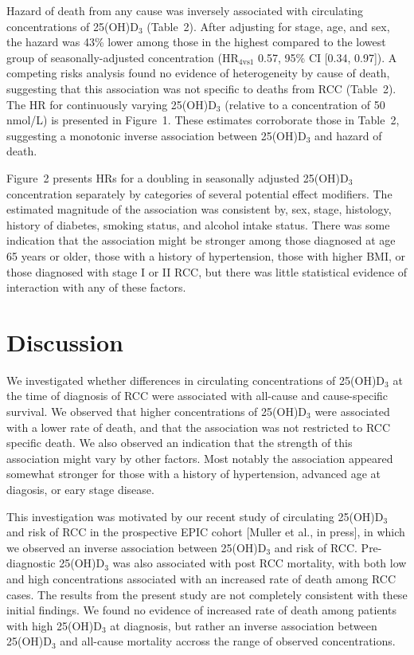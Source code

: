 \documentclass[a4paper,11pt]{article}
\begin{document}
Hazard of death from any cause was inversely associated with 
circulating concentrations of 25(OH)D$_3$ (Table~2). After adjusting for 
stage, age, and sex, the hazard was 43\% lower among those in the highest 
compared to the lowest group of seasonally-adjusted concentration 
(HR$_{4\text{vs}1}$ 0.57, 95\% CI [0.34, 0.97]). A competing risks analysis 
found no evidence of heterogeneity by cause of death, suggesting that this 
association was not specific to deaths from RCC (Table~2). The HR for 
continuously varying 25(OH)D$_3$ (relative to a concentration of 50 nmol/L) is 
presented in Figure~1. These estimates corroborate those in Table~2, suggesting 
a monotonic inverse association between 25(OH)D$_3$ and hazard of death.

Figure~2 presents HRs for a doubling in seasonally adjusted 25(OH)D$_3$ 
concentration separately by categories of several potential effect modifiers. 
The estimated magnitude of the association was consistent by, sex, stage, 
histology, history of diabetes, smoking status, and alcohol intake status. 
There was some indication that the association might be stronger among those 
diagnosed at age 65 years or older, those with a history of hypertension, those 
with higher BMI, or those diagnosed with stage I or II RCC, but there was 
little statistical evidence of interaction with any of these factors. 

\section*{Discussion}
We investigated whether differences in circulating concentrations of 
25(OH)D$_3$ at the time of diagnosis of RCC were associated with all-cause and 
cause-specific survival. We observed that higher concentrations of 25(OH)D$_3$ 
were associated with a lower rate of death, and that the 
association was not restricted to RCC specific death. We also observed an 
indication that the strength of this association might vary by other factors.
Most notably the association appeared somewhat stronger for those with a 
history of hypertension, advanced age at diagosis, or eary stage disease.

This investigation was motivated by our recent study of circulating 25(OH)D$_3$ 
and risk of RCC in the prospective EPIC cohort [Muller et al., in press], in 
which we observed an inverse association between 25(OH)D$_3$ and risk of RCC. 
Pre-diagnostic 25(OH)D$_3$ was also associated with post RCC mortality, with 
both low and high concentrations associated with an increased rate of death 
among RCC cases. The results from the present study are not completely 
consistent with these initial findings. We found no evidence of increased rate 
of death among patients with high 25(OH)D$_3$ at diagnosis, but rather an 
inverse association between 25(OH)D$_3$ and all-cause mortality accross the 
range of observed concentrations.
\end{document}
